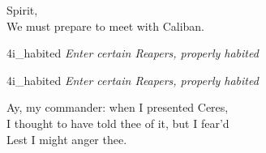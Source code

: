 
\exeunt{}




\begin{verse_speech}[Prospero] 
Spirit,\\
We must prepare to meet with Caliban.
\end{verse_speech}

\begin{pictures} %
	\begin{letter}
		\begin{colorbigpic}
			[1.1]
			{4i_habited}
			{\textit{Enter certain Reapers, properly habited}}
		\end{colorbigpic}
	\end{letter}
	\begin{a4}
		\begin{colorbigpic}
			[1.1]
			{4i_habited}
			{\textit{Enter certain Reapers, properly habited}}
		\end{colorbigpic}
	\end{a4}
\end{pictures}


\begin{verse_speech}[Ariel] 
Ay, my commander: when I presented Ceres,\\
I thought to have told thee of it, but I fear'd\\
Lest I might anger thee.
\end{verse_speech}




